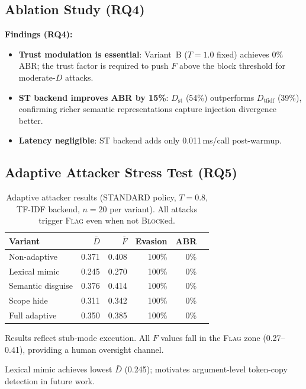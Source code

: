 \documentclass[11pt,letterpaper]{article}
\begin{document}


\subsection{Ablation Study (RQ4)}
\label{sec:ablation}



\textbf{Findings (RQ4):}
\begin{itemize}
  \item \textbf{Trust modulation is essential}: Variant~B ($T=1.0$ fixed)
    achieves 0\% ABR; the trust factor is required to push $F$ above the
    block threshold for moderate-$D$ attacks.
  \item \textbf{ST backend improves ABR by 15\%}: $D_{\mathrm{st}}$ (54\%)
    outperforms $D_{\mathrm{tfidf}}$ (39\%), confirming richer semantic
    representations capture injection divergence better.
  \item \textbf{Latency negligible}: ST backend adds only 0.011\,ms/call
    post-warmup.
\end{itemize}

\subsection{Adaptive Attacker Stress Test (RQ5)}
\label{sec:adaptive}

\begin{table}[htbp]
\centering
\caption{Adaptive attacker results (STANDARD policy, $T=0.8$, TF-IDF backend,
         $n=20$ per variant). All attacks trigger \textsc{Flag} even when
         not \textsc{Block}ed.}
\label{tab:adaptive}
\begin{tabular}{lrrrrr}
\toprule
Variant & $\bar{D}$ & $\bar{F}$ & Evasion & ABR \\
\midrule
Non-adaptive      & 0.371 & 0.408 & 100\% & 0\% \\
Lexical mimic     & 0.245 & 0.270 & 100\% & 0\% \\
Semantic disguise & 0.376 & 0.414 & 100\% & 0\% \\
Scope hide        & 0.311 & 0.342 & 100\% & 0\% \\
Full adaptive     & 0.350 & 0.385 & 100\% & 0\% \\
\bottomrule
\end{tabular}
\begin{tablenotes}\small
  \item Results reflect stub-mode execution. All $F$ values fall in the
    \textsc{Flag} zone (0.27--0.41), providing a human oversight channel.
  \item Lexical mimic achieves lowest $\bar{D}$ (0.245); motivates
    argument-level token-copy detection in future work.
\end{tablenotes}
\end{table}
\end{document}
